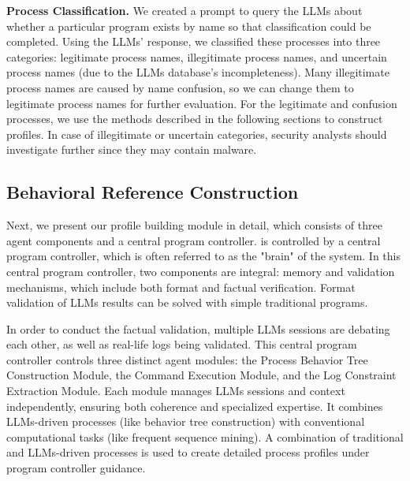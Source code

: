\noindent
{\bf Process Classification.} \label{sec:classifition}
We created a prompt to query the LLMs about whether a particular program exists by name so that classification could be completed. Using the LLMs' response, we classified these processes into three categories: legitimate process names, illegitimate process names, 
and uncertain process names (due to the LLMs database's incompleteness). Many illegitimate process names are caused by name confusion, so we can change them to legitimate process names for further evaluation.
For the legitimate and confusion processes, we use the methods described in the following sections to construct profiles. In case of illegitimate or uncertain categories, security analysts should investigate further since they may contain malware.

\subsection{Behavioral Reference Construction}
\label{sec:profile_con}
Next, we present our profile building module in detail, which consists of three agent components and a central program controller.
\tool is controlled by a central program controller, which is often referred to as the "brain" of the system. In this central program controller, two components are integral: memory and validation mechanisms, which include both format and factual verification. 
Format validation of LLMs results can be solved with simple traditional programs.

In order to conduct the factual validation, multiple LLMs sessions are debating each other, as well as real-life logs being validated.
This central program controller controls three distinct agent modules: the Process Behavior Tree Construction Module, the Command Execution Module, and the Log Constraint Extraction Module. Each module manages LLMs sessions and context independently, ensuring both coherence and specialized expertise. It combines LLMs-driven processes (like behavior tree construction) with conventional computational tasks (like frequent sequence mining). A combination of traditional and LLMs-driven processes is used to create detailed process profiles under program controller guidance.

